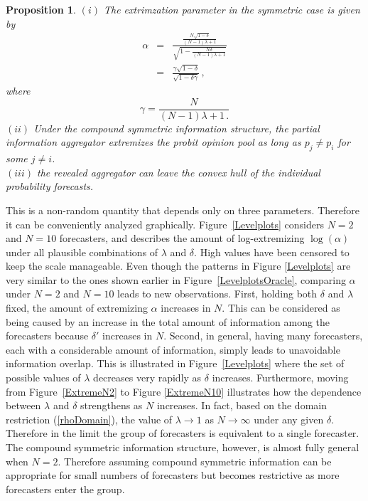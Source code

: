 \documentclass[11pt]{article}
\newtheorem{proposition}[theorem]{Proposition}
\theoremstyle{definition}
\theoremstyle{definition}
\begin{document}
\begin{proposition} \label{positiveThm}
$(i)$ The extrimzation parameter in the symmetric case is given by
\begin{eqnarray}
\alpha & = & \frac{\displaystyle{\frac{N\sqrt{1-\delta}}{(N-1)\lambda +1}}}
  {\displaystyle{\sqrt{1- \frac{N\delta}{(N-1)\lambda +1} }}} 
  \label{CompoundAlpha} \\[2ex]
& = & \frac{\gamma \sqrt{1 - \delta}}{\sqrt{1-\delta\gamma}} \nonumber \, ,
\end{eqnarray}
where 
$$\gamma = \frac{N}{(N-1)\lambda +1 \, .}$$
$(ii)$ Under the compound symmetric information structure, 
the partial information aggregator extremizes the probit opinion 
pool as long as $p_j \neq p_i$ for some $j \neq i$. \\[2ex]
$(iii)$ the revealed aggregator can leave the convex hull of the 
individual probability forecasts. 
\end{proposition}

This is a non-random quantity that depends only on three 
parameters.  Therefore it can be conveniently analyzed graphically. 
Figure~\ref{Levelplots} considers $N = 2$ and $N = 10$ forecasters, 
and describes the amount of log-extremizing $\log(\alpha)$ under 
all plausible combinations of $\lambda$ and $\delta$.  High values 
have been censored to keep the scale manageable.  Even though the 
patterns in Figure \ref{Levelplots} are very similar to the ones 
shown earlier in Figure~\ref{LevelplotsOracle}, comparing 
$\alpha$ under $N = 2$ and $N = 10$ leads to new observations. 
First, holding both $\delta$ and $\lambda$ fixed, the amount of 
extremizing $\alpha$ increases in $N$.  This can be considered as 
being caused by an increase in the total amount of information 
among the forecasters because $\delta'$ increases in $N$.  Second, 
in general, having many forecasters, each with a considerable amount 
of information, simply leads to unavoidable information overlap. 
This is illustrated in Figure~\ref{Levelplots} where the set of 
possible values of $\lambda$ decreases very rapidly as $\delta$ 
increases. Furthermore, moving from Figure~\ref{ExtremeN2} to 
Figure \ref{ExtremeN10} illustrates how the dependence between 
$\lambda$ and $\delta$ strengthens as $N$ increases.  In fact, 
based on the domain restriction (\ref{rhoDomain}), the value of 
$\lambda \to 1$ as $N \to \infty$ under any given $\delta$. 
Therefore in the limit the group of forecasters is equivalent to 
a single forecaster.  The compound symmetric information structure, 
however, is almost fully general when $N = 2$.  Therefore assuming 
compound symmetric information can be appropriate for small numbers 
of forecasters but becomes restrictive as more forecasters enter the group. 
\end{document}
